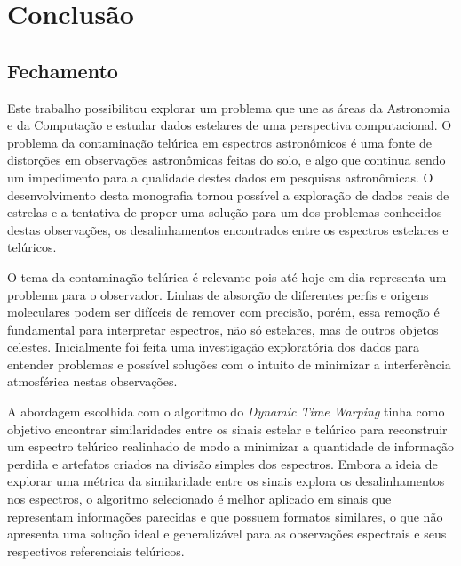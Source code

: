 \chapter{Conclusão}
\label{cap:conclusoes}

\section{Fechamento}

Este trabalho possibilitou explorar um problema que une as áreas da Astronomia e da Computação e estudar dados estelares de uma perspectiva computacional. O problema da contaminação telúrica em espectros astronômicos é uma fonte de distorções em observações astronômicas feitas do solo, e algo que continua sendo um impedimento para a qualidade destes dados em pesquisas astronômicas. O desenvolvimento desta monografia tornou possível a exploração de dados reais de estrelas e a tentativa de propor uma solução para um dos problemas conhecidos destas observações, os desalinhamentos encontrados entre os espectros estelares e telúricos.  

O tema da contaminação telúrica é relevante pois até hoje em dia representa um problema para o observador. Linhas de absorção de diferentes perfis e origens moleculares podem ser difíceis de remover com precisão, porém, essa remoção é fundamental para interpretar espectros, não só estelares, mas de outros objetos celestes. Inicialmente foi feita uma investigação exploratória dos dados para entender problemas e possível soluções com o intuito de minimizar a interferência atmosférica nestas observações.

A abordagem escolhida com o algoritmo do \textit{Dynamic Time Warping} tinha como objetivo encontrar similaridades entre os sinais estelar e telúrico para reconstruir um espectro telúrico realinhado de modo a minimizar a quantidade de informação perdida e artefatos criados na divisão simples dos espectros. Embora a ideia de explorar uma métrica da similaridade entre os sinais explora os desalinhamentos nos espectros, o algoritmo selecionado é melhor aplicado em sinais que representam informações parecidas e que possuem formatos similares, o que não apresenta uma solução ideal e generalizável para as observações espectrais e seus respectivos referenciais telúricos.   

